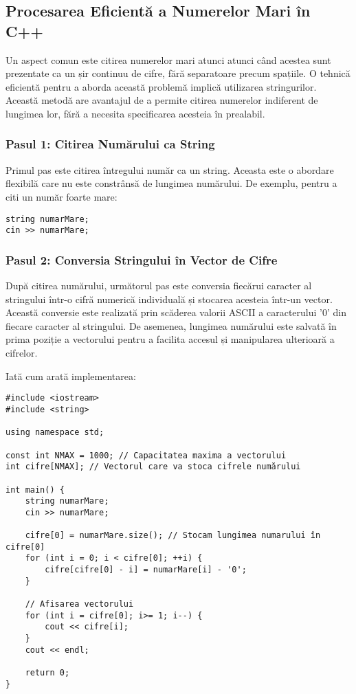 \subsection*{Procesarea Eficientă a Numerelor Mari în C++}

Un aspect comun este citirea numerelor mari atunci atunci când acestea sunt prezentate ca un șir continuu de cifre, fără separatoare precum spațiile. O tehnică eficientă pentru a aborda această problemă implică utilizarea stringurilor. Această metodă are avantajul de a permite citirea numerelor indiferent de lungimea lor, fără a necesita specificarea acesteia în prealabil.

\subsubsection*{Pasul 1: Citirea Numărului ca String}

Primul pas este citirea întregului număr ca un string. Aceasta este o abordare flexibilă care nu este constrânsă de lungimea numărului. De exemplu, pentru a citi un număr foarte mare:

\begin{verbatim}
string numarMare;
cin >> numarMare;
\end{verbatim}

\subsubsection*{Pasul 2: Conversia Stringului în Vector de Cifre}

După citirea numărului, următorul pas este conversia fiecărui caracter al stringului într-o cifră numerică individuală și stocarea acesteia într-un vector. Această conversie este realizată prin scăderea valorii ASCII a caracterului '$0$' din fiecare caracter al stringului. De asemenea, lungimea numărului este salvată în prima poziție a vectorului pentru a facilita accesul și manipularea ulterioară a cifrelor. 

Iată cum arată implementarea:

\begin{verbatim}
#include <iostream>
#include <string>

using namespace std;

const int NMAX = 1000; // Capacitatea maxima a vectorului
int cifre[NMAX]; // Vectorul care va stoca cifrele numărului

int main() {
    string numarMare;
    cin >> numarMare;

    cifre[0] = numarMare.size(); // Stocam lungimea numarului în cifre[0]
    for (int i = 0; i < cifre[0]; ++i) {
        cifre[cifre[0] - i] = numarMare[i] - '0'; 
    }

    // Afisarea vectorului
    for (int i = cifre[0]; i>= 1; i--) {
        cout << cifre[i];
    }
    cout << endl;

    return 0;
}
\end{verbatim}

